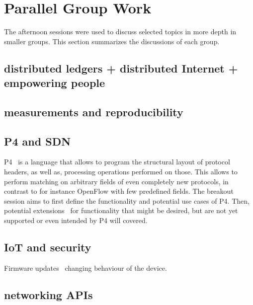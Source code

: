 \section{Parallel Group Work}\label{sec:parallel-group-work}

The afternoon sessions were used to discuss selected topics in more depth in
smaller groups. This section summarizes the discussions of each group.


\subsection{distributed ledgers + distributed Internet + empowering people}

\subsection{measurements and reproducibility}

\cite{fbai:infocom:2003}

\subsection{P4 and SDN}

P4~\cite{pbosshart:ccr:2014} is a language that allows to program the
structural layout of protocol headers, as well as, processing operations
performed on those.  This allows to perform matching on arbitrary fields of
even completely new protocols, in contrast to for instance OpenFlow with few
predefined fields.  The breakout session aims to first define the
functionality and potential use cases of P4.  Then, potential
extensions~\cite{abhashkumar:sosr:2017} for functionality that might be
desired, but are not yet supported or even intended by P4 will covered.

\subsection{IoT and security}

Firmware updates~\cite{philips, hp} changing behaviour of the device.

\subsection{networking APIs}

